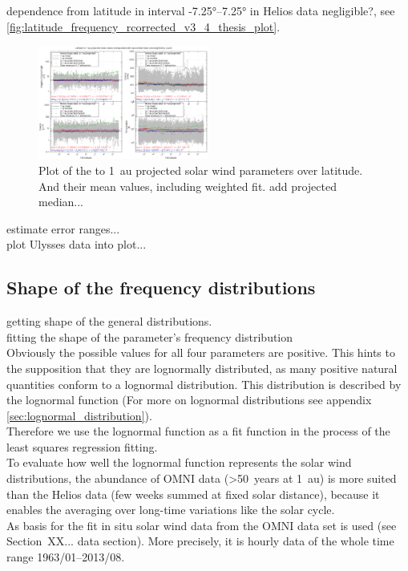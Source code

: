 dependence from latitude in interval -7.25°--7.25° in Helios data negligible?, see \autoref{fig:latitude_frequency_rcorrected_v3_4_thesis_plot}.
\begin{figure}[htb]
	\centering
	\includegraphics[width=0.5\textwidth]{images/gnuplots/latitude_frequency_rcorrected_v3_4_thesis_plot.png}
	\caption{Plot of the to 1~au projected solar wind parameters over latitude. And their mean values, including weighted fit. add projected median...}
	\label{fig:latitude_frequency_rcorrected_v3_4_thesis_plot}
\end{figure}
estimate error ranges...\\

plot Ulysses data into plot...\\


\subsection{Shape of the frequency distributions}

getting shape of the general distributions.\\

fitting the shape of the parameter's frequency distribution\\

Obviously the possible values for all four parameters are positive. This hints to the supposition that they are lognormally distributed, as many positive natural quantities conform to a lognormal distribution. This distribution is described by the lognormal function (For more on lognormal distributions see appendix \autoref{sec:lognormal_distribution}).\\

Therefore we use the lognormal function as a fit function in the process of the least squares regression fitting.\\
To evaluate how well the lognormal function represents the solar wind distributions, the abundance of OMNI data (>50~years at 1~au) is more suited than the Helios data (few weeks summed at fixed solar distance), because it enables the averaging over long-time variations like the solar cycle.\\
As basis for the fit in situ solar wind data from the OMNI data set is used (see Section~XX... data section). More precisely, it is hourly data of the whole time range 1963/01--2013/08.\\

